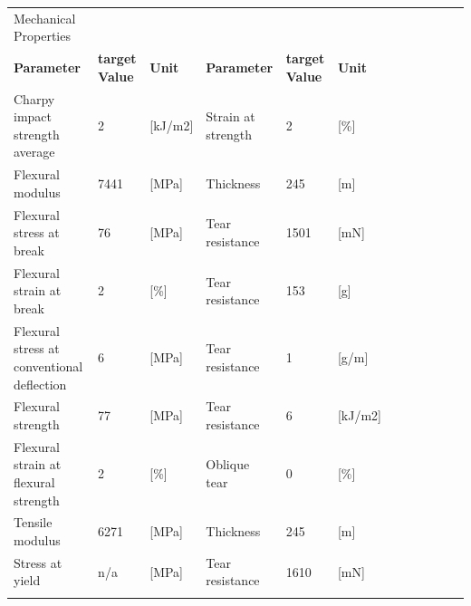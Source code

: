 \documentclass{article}
\begin{document}
\begin{center}
		\begin{tabularx}{\textwidth}{ X l X l X l X l X l X l }
			\rowcolor{LightCyan} Mechanical Properties &                       &               &                    &                       &               \\
			\textbf{Parameter}                         & \textbf{target Value} & \textbf{Unit} & \textbf{Parameter} & \textbf{target Value} & \textbf{Unit} \\
			\arrayrulecolor{line_color}\hline
			Charpy impact strength average             & 2                     & [kJ/m2]       & Strain at strength & 2                     & [\%]          \\
			\arrayrulecolor{line_color}\hline
			Flexural modulus                           & 7441                  & [MPa]         & Thickness          & 245                   & [m]           \\
			\arrayrulecolor{line_color}\hline
			Flexural stress at break                   & 76                    & [MPa]         & Tear resistance    & 1501                  & [mN]          \\
			\arrayrulecolor{line_color}\hline
			Flexural strain at break                   & 2                     & [\%]          & Tear resistance    & 153                   & [g]           \\
			\arrayrulecolor{line_color}\hline
			Flexural stress at conventional deflection & 6                     & [MPa]         & Tear resistance    & 1                     & [g/m]         \\
			\arrayrulecolor{line_color}\hline
			Flexural strength                          & 77                    & [MPa]         & Tear resistance    & 6                     & [kJ/m2]       \\
			\arrayrulecolor{line_color}\hline
			Flexural strain at flexural strength       & 2                     & [\%]          & Oblique tear       & 0                     & [\%]          \\
			\arrayrulecolor{line_color}\hline
			Tensile modulus                            & 6271                  & [MPa]         & Thickness          & 245                   & [m]           \\
			\arrayrulecolor{line_color}\hline
			Stress at yield                            & n/a                   & [MPa]         & Tear resistance    & 1610                  & [mN]          \\
			\arrayrulecolor{line_color}\hline

\end{tabularx}
\end{center}
\end{document}
